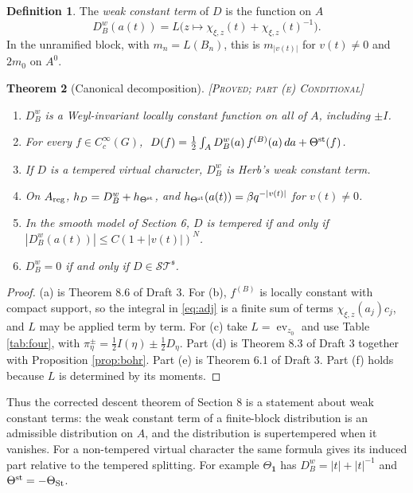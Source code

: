 \documentclass[12pt,letterpaper]{amsart}
\numberwithin{equation}{section}
\newtheorem{theorem}{Theorem}[section]
\theoremstyle{definition}
\newtheorem{definition}[theorem]{Definition}
\theoremstyle{remark}
\newcommand{\St}{\mathrm{St}}
\newcommand{\triv}{\mathbf 1}
\newcommand{\ST}{\mathcal{ST}}
\newcommand{\ev}{\operatorname{ev}}
\newcommand{\status}[1]{\textup{[\textsc{#1}]}}
\begin{document}
\begin{definition}\label{def:wct}
The \emph{weak constant term} of $D$ is the function on $A$
\[
D^w_B(a(t))=L\bigl(z\mapsto\chi_{\xi,z}(t)+\chi_{\xi,z}(t)^{-1}\bigr).
\]
In the unramified block, with $m_n=L(B_n)$, this is $m_{|v(t)|}$ for $v(t)\ne0$ and $2m_0$ on $A^0$.
\end{definition}

\begin{theorem}[Canonical decomposition]\label{thm:decomp}\status{Proved; part (e) Conditional}
\begin{enumerate}[label=(\alph*),leftmargin=*]
\item $D^w_B$ is a Weyl-invariant locally constant function on all of $A$, including $\pm I$.
\item For every $f\in C_c^\infty(G)$, $\ D(f)=\tfrac12\int_AD^w_B(a)\,f^{(B)}(a)\,da+\Theta^{\rm st}(f)$.
\item If $D$ is a tempered virtual character, $D^w_B$ is Herb's weak constant term.
\item On $A_{\rm reg}$, $h_D=D^w_B+h_{\Theta^{\rm st}}$, and $h_{\Theta^{\rm st}}(a(t))=\beta q^{-|v(t)|}$ for $v(t)\ne0$.
\item In the smooth model of Section 6, $D$ is tempered if and only if $|D^w_B(a(t))|\le C(1+|v(t)|)^N$.
\item $D^w_B=0$ if and only if $D\in\ST^{\mathfrak s}$.
\end{enumerate}
\end{theorem}
\begin{proof}
(a) is Theorem 8.6 of Draft 3. For (b), $f^{(B)}$ is locally constant with compact support, so the integral in \eqref{eq:adj} is a finite sum of terms $\chi_{\xi,z}(a_j)c_j$, and $L$ may be applied term by term. For (c) take $L=\ev_{z_0}$ and use Table \ref{tab:four}, with $\pi_\eta^\pm=\tfrac12I(\eta)\pm\tfrac12D_\eta$. Part (d) is Theorem 8.3 of Draft 3 together with Proposition \ref{prop:bohr}. Part (e) is Theorem 6.1 of Draft 3. Part (f) holds because $L$ is determined by its moments.
\end{proof}
Thus the corrected descent theorem of Section 8 is a statement about weak constant terms: the weak constant term of a finite-block distribution is an admissible distribution on $A$, and the distribution is supertempered when it vanishes. For a non-tempered virtual character the same formula gives its induced part relative to the tempered splitting. For example $\Theta_{\triv}$ has $D^w_B=|t|+|t|^{-1}$ and $\Theta^{\rm st}=-\Theta_{\St}$.
\end{document}

